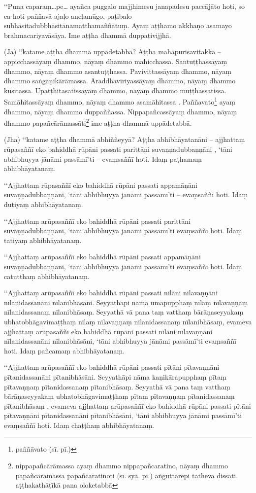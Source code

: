 ‘‘Puna caparaṃ…pe… ayañca puggalo majjhimesu janapadesu paccājāto hoti, so ca hoti paññavā ajaḷo aneḷamūgo, paṭibalo subhāsitadubbhāsitānamatthamaññātuṃ. Ayaṃ aṭṭhamo akkhaṇo asamayo brahmacariyavāsāya. Ime aṭṭha dhammā duppaṭivijjhā.

(Ja) ‘‘katame aṭṭha dhammā uppādetabbā? Aṭṭha mahāpurisavitakkā – appicchassāyaṃ dhammo, nāyaṃ dhammo mahicchassa. Santuṭṭhassāyaṃ dhammo, nāyaṃ dhammo asantuṭṭhassa. Pavivittassāyaṃ dhammo, nāyaṃ dhammo saṅgaṇikārāmassa. Āraddhavīriyassāyaṃ dhammo, nāyaṃ dhammo kusītassa. Upaṭṭhitasatissāyaṃ dhammo, nāyaṃ dhammo muṭṭhassatissa. Samāhitassāyaṃ dhammo, nāyaṃ dhammo asamāhitassa . Paññavato\footnote{paññāvato (sī. pī.)} ayaṃ dhammo, nāyaṃ dhammo duppaññassa. Nippapañcassāyaṃ dhammo, nāyaṃ dhammo papañcārāmassāti\footnote{nippapañcārāmassa ayaṃ dhammo nippapañcaratino, nāyaṃ dhammo papañcārāmassa papañcaratinoti (sī. syā. pī.) aṅguttarepi tatheva dissati. aṭṭhakathāṭīkā pana oloketabbā} ime aṭṭha dhammā uppādetabbā.

(Jha) ‘‘katame aṭṭha dhammā abhiññeyyā? Aṭṭha abhibhāyatanāni – ajjhattaṃ rūpasaññī eko bahiddhā rūpāni passati parittāni suvaṇṇadubbaṇṇāni , ‘tāni abhibhuyya jānāmi passāmī’ti – evaṃsaññī hoti. Idaṃ paṭhamaṃ abhibhāyatanaṃ.

‘‘Ajjhattaṃ rūpasaññī eko bahiddhā rūpāni passati appamāṇāni suvaṇṇadubbaṇṇāni, ‘tāni abhibhuyya jānāmi passāmī’ti – evaṃsaññī hoti. Idaṃ dutiyaṃ abhibhāyatanaṃ.

‘‘Ajjhattaṃ arūpasaññī eko bahiddhā rūpāni passati parittāni suvaṇṇadubbaṇṇāni, ‘tāni abhibhuyya jānāmi passāmī’ti evaṃsaññī hoti. Idaṃ tatiyaṃ abhibhāyatanaṃ.

‘‘Ajjhattaṃ arūpasaññī eko bahiddhā rūpāni passati appamāṇāni suvaṇṇadubbaṇṇāni, ‘tāni abhibhuyya jānāmi passāmī’ti evaṃsaññī hoti. Idaṃ catutthaṃ abhibhāyatanaṃ.

‘‘Ajjhattaṃ arūpasaññī eko bahiddhā rūpāni passati nīlāni nīlavaṇṇāni nīlanidassanāni nīlanibhāsāni. Seyyathāpi nāma umāpupphaṃ nīlaṃ nīlavaṇṇaṃ nīlanidassanaṃ nīlanibhāsaṃ. Seyyathā vā pana taṃ vatthaṃ bārāṇaseyyakaṃ ubhatobhāgavimaṭṭhaṃ nīlaṃ nīlavaṇṇaṃ nīlanidassanaṃ nīlanibhāsaṃ, evameva ajjhattaṃ arūpasaññī eko bahiddhā rūpāni passati nīlāni nīlavaṇṇāni nīlanidassanāni nīlanibhāsāni, ‘tāni abhibhuyya jānāmi passāmī’ti evaṃsaññī hoti. Idaṃ pañcamaṃ abhibhāyatanaṃ.

‘‘Ajjhattaṃ arūpasaññī eko bahiddhā rūpāni passati pītāni pītavaṇṇāni pītanidassanāni pītanibhāsāni. Seyyathāpi nāma kaṇikārapupphaṃ pītaṃ pītavaṇṇaṃ pītanidassanaṃ pītanibhāsaṃ. Seyyathā vā pana taṃ vatthaṃ bārāṇaseyyakaṃ ubhatobhāgavimaṭṭhaṃ pītaṃ pītavaṇṇaṃ pītanidassanaṃ pītanibhāsaṃ , evameva ajjhattaṃ arūpasaññī eko bahiddhā rūpāni passati pītāni pītavaṇṇāni pītanidassanāni pītanibhāsāni, ‘tāni abhibhuyya jānāmi passāmī’ti evaṃsaññī hoti. Idaṃ chaṭṭhaṃ abhibhāyatanaṃ.

